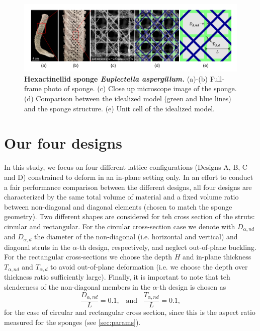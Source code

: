 \documentclass[10pt,twoside]{fernandes_supp}
\begin{document}
\begin{figure}
    \centering
    \includegraphics[width=0.9\linewidth]{SFig1.png}
    \caption{\textbf{Hexactinellid sponge \textit{Euplectella aspergillum.}} (a)-(b) Full-frame photo of sponge.  (c)  Close up microscope image of the sponge. (d) Comparison between the idealized model (green and blue lines) and the sponge structure. (e) Unit cell of the idealized model.}
    \label{Sponge}
\end{figure}

\section{Our four designs}\label{sec:designs}
In this study, we focus on four different lattice configurations (Designs A, B, C and D) constrained to deform in an in-plane setting only. In an effort to conduct a fair performance comparison between the different designs, all four designs are characterized by the same total volume of material and a fixed volume ratio between non-diagonal and diagonal elements (chosen to match the sponge geometry).  Two different shapes are considered for teh cross section of the struts: circular and rectangular.  For the circular cross-section case  we denote with $D_{\alpha,nd}$ and $D_{\alpha,d}$ the diameter of the non-diagonal (i.e. horizontal and vertical) and diagonal struts in the $\alpha$-th design, respectively, and neglect out-of-plane buckling. For the rectangular cross-sections we choose the depth $H$ and in-plane thickness $T_{\alpha,nd}$ and $T_{\alpha,d}$  to avoid out-of-plane deformation (i.e. we choose the  depth over thickness ratio sufficiently large). Finally, it is important to note that teh slenderness of the non-diagonal members in the $\alpha$-th design is chosen as 
\begin{equation}
\frac{D_{\alpha,nd}}{L}=0.1,\;\;\;\text{and}\;\;\;\frac{T_{\alpha,nd}}{L}=0.1,
\end{equation}
for the case of circular and rectangular cross section, since this is the aspect ratio measured for the sponges (see \cref{sec:params}).
\end{document}

